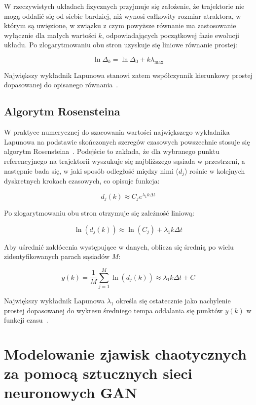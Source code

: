 W rzeczywistych układach fizycznych przyjmuje się założenie, że trajektorie nie mogą oddalić się od siebie bardziej, niż wynosi całkowity rozmiar atraktora, w którym są uwięzione, w związku z czym powyższe równanie ma zastosowanie wyłącznie dla małych wartości $k$, odpowiadających początkowej fazie ewolucji układu. Po zlogarytmowaniu obu stron uzyskuje się liniowe równanie prostej:
 
\begin{equation}
\ln \Delta_k = \ln \Delta_0 + k \lambda_{\max}
\end{equation}
 
Największy wykładnik Lapunowa stanowi zatem współczynnik kierunkowy prostej dopasowanej do opisanego równania~\cite{wykładnikLaponowa5, wykładnikLaponowa6}. 
 
\subsection{Algorytm Rosensteina}
 
W praktyce numerycznej do szacowania wartości największego wykładnika Lapunowa na podstawie skończonych szeregów czasowych powszechnie stosuje się algorytm Rosensteina~\cite{rosenstein1993}. Podejście to zakłada, że dla wybranego punktu referencyjnego na trajektorii wyszukuje się najbliższego sąsiada w przestrzeni, a następnie bada się, w jaki sposób odległość między nimi ($d_j$) rośnie w kolejnych dyskretnych krokach czasowych, co opisuje funkcja:
 
\[d_j(k)\approx C_j e^{\lambda_1 k\Delta t}\]
 
Po zlogarytmowaniu obu stron otrzymuje się zależność liniową:
 
\[\ln(d_j(k))\approx\ln(C_j)+\lambda_1 k\Delta t\]
 
Aby uśrednić zakłócenia występujące w danych, oblicza się średnią po wielu zidentyfikowanych parach sąsiadów $M$:
 
\[y(k)=\frac{1}{M}\sum_{j=1}^M\ln(d_j(k))\approx\lambda_1 k\Delta t+C\]
 
Największy wykładnik Lapunowa $\lambda_1$ określa się ostatecznie jako nachylenie prostej dopasowanej do wykresu średniego tempa oddalania się punktów $y(k)$ w funkcji czasu~\cite{rosensteina}.
 
\section{Modelowanie zjawisk chaotycznych za pomocą sztucznych sieci neuronowych GAN}
 
